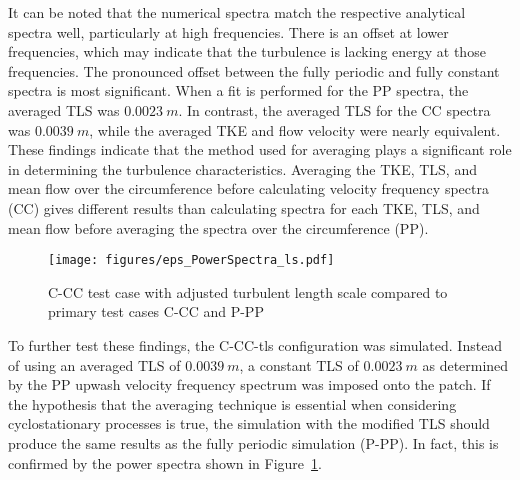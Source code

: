 It can be noted that the numerical spectra match the respective analytical spectra well, particularly at high frequencies.  There is an offset at lower frequencies, which may indicate that the turbulence is lacking energy at those frequencies.  The pronounced offset between the fully periodic and fully constant spectra is most significant.  When a fit is performed for the PP spectra,  the averaged TLS was $\SI{0.0023}{m}$.  In contrast, the averaged TLS for the CC spectra was $\SI{0.0039}{m}$, while the averaged TKE and flow velocity were nearly equivalent.  These findings indicate that the method used for averaging plays a significant role in determining the turbulence characteristics.  Averaging the TKE, TLS, and mean flow over the circumference before calculating velocity frequency spectra (CC) gives different results than calculating spectra for each TKE, TLS, and mean flow before averaging the spectra over the circumference (PP).  
\begin{figure}
\centering
\texttt{[image: figures/eps\_PowerSpectra\_ls.pdf]} 
\caption{C-CC test case with adjusted turbulent length scale compared to primary test cases C-CC and P-PP \label{fig:PowerSpectra_ls} }
\end{figure}

To further test these findings, the C-CC-tls configuration was simulated.  Instead of using an averaged TLS of $\SI{0.0039}{m}$, a constant TLS of $\SI{0.0023}{m}$ as determined by the PP upwash velocity frequency spectrum was imposed onto the patch.  If the hypothesis that the averaging technique is essential when considering cyclostationary processes is true, the simulation with the modified TLS should produce the same results as the fully periodic simulation (P-PP).  In fact, this is confirmed by the power spectra shown in Figure~\ref{fig:PowerSpectra_ls}.                 


